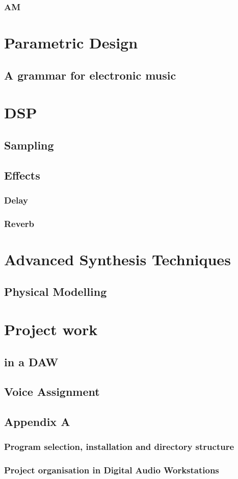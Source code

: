 \documentclass[11pt]{article}
\begin{document}
\subsubsection{AM}
\label{sec:orgfc0e124}

\section{Parametric Design}
\label{sec:org0bb6ae8}
\subsection{A grammar for electronic music}
\label{sec:orgb031530}

\section{DSP}
\label{sec:org05dd794}
\subsection{Sampling}
\label{sec:orgfb83e5c}
\subsection{Effects}
\label{sec:orgb086068}
\subsubsection{Delay}
\label{sec:org6f6d58c}
\subsubsection{Reverb}
\label{sec:orgbdb2a30}

\section{Advanced Synthesis Techniques}
\label{sec:orgb1936f6}
\subsection{Physical Modelling}
\label{sec:orgd13b5f3}

\section{Project work}
\label{sec:org98e0629}
\subsection{in a DAW}
\label{sec:org43e83d5}
\subsection{Voice Assignment}
\label{sec:orga7faff1}

\subsection{Appendix A}
\label{sec:org23c8300}
\subsubsection{Program selection, installation and directory structure}
\label{sec:org5a8e7d2}
\subsubsection{Project organisation in Digital Audio Workstations}
\label{sec:org8df52e7}
\end{document}

